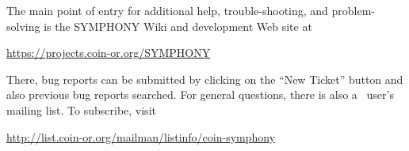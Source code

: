 The main point of entry for additional help, trouble-shooting, and
problem-solving is the SYMPHONY Wiki and development Web site at
\begin{center}
\url{https://projects.coin-or.org/SYMPHONY}
\end{center}
There, bug reports can be submitted by clicking on the ``New Ticket'' button
and also previous bug reports searched. For general questions, there is also a
\BB\ user's mailing list. To subscribe, visit
\begin{center}
\url{http://list.coin-or.org/mailman/listinfo/coin-symphony}
\end{center}


